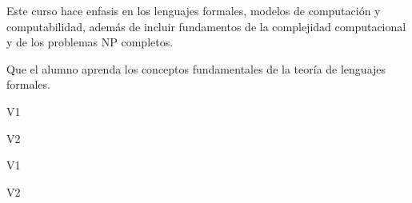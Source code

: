 \begin{syllabus}


\begin{justification}
Este curso hace enfasis en los lenguajes formales, modelos de computación y computabilidad, además de incluir fundamentos de la complejidad computacional y de los problemas NP completos.
\end{justification}

\begin{goals}
\item Que el alumno aprenda los conceptos fundamentales de la teoría de lenguajes formales.
\end{goals}

\begin{outcomes}{V1}
    \item {}
    \item {}
    \item {}
\end{outcomes}

\begin{outcomes}{V2}
    \item {}
    \item {}
    \item {}
\end{outcomes}

\begin{competences}{V1}
    \item {} 
    \item {} 
\end{competences}

\begin{competences}{V2}
    \item {} 
    \item {} 
\end{competences}


\end{syllabus}
